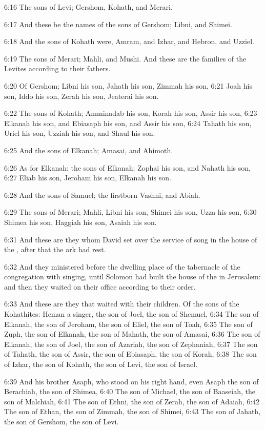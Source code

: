 6:16 The sons of Levi; Gershom, Kohath, and Merari.

6:17 And these be the names of the sons of Gershom; Libni, and Shimei.

6:18 And the sons of Kohath were, Amram, and Izhar, and Hebron, and
Uzziel.

6:19 The sons of Merari; Mahli, and Mushi. And these are the families
of the Levites according to their fathers.

6:20 Of Gershom; Libni his son, Jahath his son, Zimmah his son, 6:21
Joah his son, Iddo his son, Zerah his son, Jeaterai his son.

6:22 The sons of Kohath; Amminadab his son, Korah his son, Assir his
son, 6:23 Elkanah his son, and Ebiasaph his son, and Assir his son,
6:24 Tahath his son, Uriel his son, Uzziah his son, and Shaul his son.

6:25 And the sons of Elkanah; Amasai, and Ahimoth.

6:26 As for Elkanah: the sons of Elkanah; Zophai his son, and Nahath
his son, 6:27 Eliab his son, Jeroham his son, Elkanah his son.

6:28 And the sons of Samuel; the firstborn Vashni, and Abiah.

6:29 The sons of Merari; Mahli, Libni his son, Shimei his son, Uzza
his son, 6:30 Shimea his son, Haggiah his son, Asaiah his son.

6:31 And these are they whom David set over the service of song in the
house of the \LORD, after that the ark had rest.

6:32 And they ministered before the dwelling place of the tabernacle
of the congregation with singing, until Solomon had built the house of
the \LORD in Jerusalem: and then they waited on their office according
to their order.

6:33 And these are they that waited with their children. Of the sons
of the Kohathites: Heman a singer, the son of Joel, the son of
Shemuel, 6:34 The son of Elkanah, the son of Jeroham, the son of
Eliel, the son of Toah, 6:35 The son of Zuph, the son of Elkanah, the
son of Mahath, the son of Amasai, 6:36 The son of Elkanah, the son of
Joel, the son of Azariah, the son of Zephaniah, 6:37 The son of
Tahath, the son of Assir, the son of Ebiasaph, the son of Korah, 6:38
The son of Izhar, the son of Kohath, the son of Levi, the son of
Israel.

6:39 And his brother Asaph, who stood on his right hand, even Asaph
the son of Berachiah, the son of Shimea, 6:40 The son of Michael, the
son of Baaseiah, the son of Malchiah, 6:41 The son of Ethni, the son
of Zerah, the son of Adaiah, 6:42 The son of Ethan, the son of Zimmah,
the son of Shimei, 6:43 The son of Jahath, the son of Gershom, the son
of Levi.

